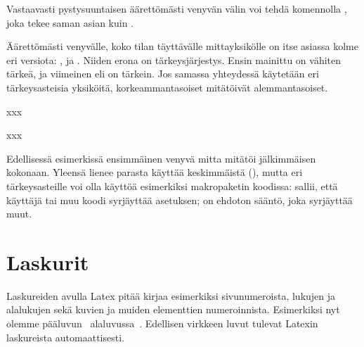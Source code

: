 Vastaavasti pystysuuntaisen äärettömästi venyvän välin voi tehdä
komennolla , joka tekee saman asian kuin .

Äärettömästi venyvälle, koko tilan täyttävälle mittayksikölle on itse
asiassa kolme eri versiota: ,  ja .
Niiden erona on tärkeysjärjestys. Ensin mainittu  on vähiten
tärkeä, ja viimeinen eli  on tärkein. Jos samassa
yhteydessä käytetään eri tär\-keys\-as\-tei\-sia yksiköitä,
korkeammantasoiset mitätöivät alemmantasoiset.


\begin{koodilohkosis}
  x\hspace{0mm plus 1filll}x\hspace{0mm plus 1fill}x
\end{koodilohkosis}

\begin{tulossis}
  x\hspace{0mm plus 1filll}x\hspace{0mm plus 1fill}x
\end{tulossis}

Edellisessä esimerkissä ensimmäinen venyvä mitta  mitätöi
jälkimmäisen  kokonaan. Yleensä lienee parasta käyttää
keskimmäistä (), mutta eri tär\-keys\-as\-teil\-le voi olla
käyttöä esimerkiksi makropaketin koodissa:  sallii, että
käyttäjä tai muu koodi syrjäyttää asetuksen;  on ehdoton
sääntö, joka syrjäyttää muut.

\section{Laskurit}
\label{luku:laskurit}

Laskureiden avulla Latex pitää kirjaa esimerkiksi sivunumeroista,
lukujen ja alalukujen sekä kuvien ja muiden elementtien numeroinnista.
Esimerkiksi nyt olemme pääluvun~
alaluvussa~. Edellisen virkkeen luvut tulevat Latexin
laskureista automaattisesti.


